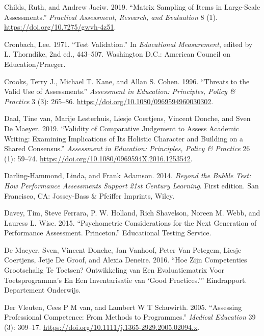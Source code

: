 \documentclass[
  letterpaper,
]{report}
\newlength{\cslhangindent}
\newlength{\cslentryspacingunit} %
\newenvironment{CSLReferences}[2] %
 {%
  \setlength{\parindent}{0pt}
  \ifodd #1
  \let\oldpar\par
  \def\par{\hangindent=\cslhangindent\oldpar}
  \fi
  \setlength{\parskip}{#2\cslentryspacingunit}
 }%
 {}
\begin{document}
\begin{CSLReferences}{1}{0}
\leavevmode{}%
Childs, Ruth, and Andrew Jaciw. 2019. {``Matrix {Sampling} of {Items} in
{Large-Scale Assessments}.''} \emph{Practical Assessment, Research, and
Evaluation} 8 (1). \url{https://doi.org/10.7275/gwvh-4z51}.

\leavevmode{}%
Cronbach, Lee. 1971. {``Test Validation.''} In \emph{Educational
{Measurement}}, edited by L. Thorndike, 2nd ed., 443--507. {Washington
D.C.}: {American Council on Education/Praeger}.

\leavevmode{}%
Crooks, Terry J., Michael T. Kane, and Allan S. Cohen. 1996. {``Threats
to the {Valid Use} of {Assessments}.''} \emph{Assessment in Education:
Principles, Policy \& Practice} 3 (3): 265--86.
\url{https://doi.org/10.1080/0969594960030302}.

\leavevmode{}%
Daal, Tine van, Marije Lesterhuis, Liesje Coertjens, Vincent Donche, and
Sven De Maeyer. 2019. {``Validity of Comparative Judgement to Assess
Academic Writing: Examining Implications of Its Holistic Character and
Building on a Shared Consensus.''} \emph{Assessment in Education:
Principles, Policy \& Practice} 26 (1): 59--74.
\url{https://doi.org/10.1080/0969594X.2016.1253542}.

\leavevmode{}%
Darling-Hammond, Linda, and Frank Adamson. 2014. \emph{Beyond the Bubble
Test: How Performance Assessments Support 21st Century Learning}. First
edition. {San Francisco, CA}: {Jossey-Bass \& Pfeiffer Imprints, Wiley}.

\leavevmode{}%
Davey, Tim, Steve Ferrara, P. W. Holland, Rich Shavelson, Noreen M.
Webb, and Lauress L. Wise. 2015. {``Psychometric Considerations for the
Next Generation of Performance Assessment. {Princeton}.''} {Educational
Testing Service}.

\leavevmode{}%
De Maeyer, Sven, Vincent Donche, Jan Vanhoof, Peter Van Petegem, Liesje
Coertjens, Jetje De Groof, and Alexia Deneire. 2016. {``Hoe Zijn
Competenties Grootschalig Te Toetsen? {Ontwikkeling} van Een
Evaluatiematrix Voor Toetsprogramma's En Een Inventarisatie van {`Good
Practices.'}''} Eindrapport. {Departement Onderwijs}.

\leavevmode{}%
Der Vleuten, Cees P M van, and Lambert W T Schuwirth. 2005. {``Assessing
Professional Competence: From Methods to Programmes.''} \emph{Medical
Education} 39 (3): 309--17.
\url{https://doi.org/10.1111/j.1365-2929.2005.02094.x}.


\end{CSLReferences}
\end{document}
